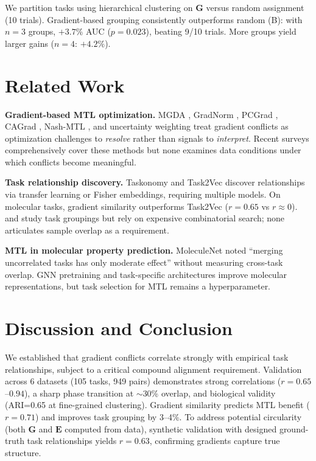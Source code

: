 \documentclass{article}
\newcommand{\G}{\mathbf{G}}
\newcommand{\E}{\mathbf{E}}
\begin{document}
We partition tasks using hierarchical clustering on $\G$ versus random assignment (10 trials). Gradient-based grouping consistently outperforms random (B): with $n=3$ groups, $+3.7\%$ AUC ($p = 0.023$), beating 9/10 trials. More groups yield larger gains ($n=4$: $+4.2\%$).

\section{Related Work}

\textbf{Gradient-based MTL optimization.} MGDA \citep{sener2018multi}, GradNorm \citep{chen2018gradnorm}, PCGrad \citep{yu2020gradient}, CAGrad \citep{liu2021conflict}, Nash-MTL \citep{navon2022multi}, and uncertainty weighting \citep{kendall2018multi} treat gradient conflicts as optimization challenges to \textit{resolve} rather than signals to \textit{interpret}. Recent surveys \citep{zhang2021survey} comprehensively cover these methods but none examines data conditions under which conflicts become meaningful.

\textbf{Task relationship discovery.} Taskonomy \citep{zamir2018taskonomy} and Task2Vec \citep{achille2019task2vec} discover relationships via transfer learning or Fisher embeddings, requiring multiple models. On molecular tasks, gradient similarity outperforms Task2Vec ($r = 0.65$ vs $r \approx 0$). \citet{fifty2021efficiently} and \citet{standley2020tasks} study task groupings but rely on expensive combinatorial search; none articulates sample overlap as a requirement.

\textbf{MTL in molecular property prediction.} MoleculeNet \citep{wu2018moleculenet} noted ``merging uncorrelated tasks has only moderate effect'' without measuring cross-task overlap. GNN pretraining \citep{hu2020pretraining} and task-specific architectures \citep{gilmer2017neural, yang2019analyzing} improve molecular representations, but task selection for MTL remains a hyperparameter.

\section{Discussion and Conclusion}

We established that gradient conflicts correlate strongly with empirical task relationships, subject to a critical compound alignment requirement. Validation across 6 datasets (105 tasks, 949 pairs) demonstrates strong correlations ($r = 0.65$--$0.94$), a sharp phase transition at $\sim$30\% overlap, and biological validity (ARI=0.65 at fine-grained clustering). Gradient similarity predicts MTL benefit ($r = 0.71$) and improves task grouping by 3--4\%. To address potential circularity (both $\G$ and $\E$ computed from data), synthetic validation with designed ground-truth task relationships yields $r = 0.63$, confirming gradients capture true structure.
\end{document}
